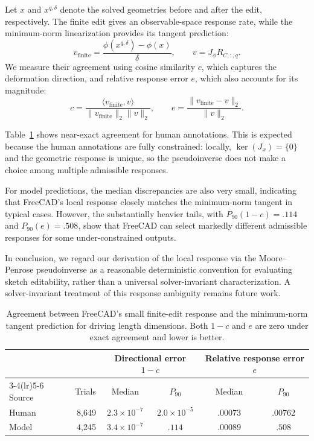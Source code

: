Let $x$ and $x^{q,\delta}$ denote the solved geometries before and after the edit, respectively. The finite edit gives an observable-space response rate, while the minimum-norm linearization provides its tangent prediction:
\begin{equation}
v_{\mathrm{finite}}=\frac{\phi(x^{q,\delta})-\phi(x)}{\delta},
\qquad
v=J_\phi R_{C,:,q}.
\end{equation}
We measure their agreement using cosine similarity $c$, which captures the deformation direction, and relative response error $e$, which also accounts for its magnitude:
\begin{equation}
c=
\frac{\langle v_{\mathrm{finite}},v\rangle}
{\|v_{\mathrm{finite}}\|_2\|v\|_2},
\qquad
e=
\frac{\|v_{\mathrm{finite}}-v\|_2}
{\|v\|_2}.
\end{equation}

Table~\ref{tab:appendix_solver_anchor} shows near-exact agreement for
human annotations. This is expected because the human annotations are
fully constrained: locally, $\ker(J_x)=\{0\}$ and the geometric
response is unique, so the pseudoinverse does not make a choice among
multiple admissible responses.

For model predictions, the median discrepancies are also very small, indicating that FreeCAD's local response closely matches the minimum-norm tangent in typical cases.
However, the substantially heavier tails, with $P_{90}(1-c)=.114$ and $P_{90}(e)=.508$, show that FreeCAD can select markedly different admissible responses for some under-constrained outputs.

In conclusion, we regard our derivation of the local response via the Moore--Penrose pseudoinverse as a reasonable deterministic convention for evaluating sketch editability, rather than a universal solver-invariant characterization. A solver-invariant treatment of this response ambiguity remains future work.

\begin{table}[t]
    \centering
    \footnotesize
    \setlength{\tabcolsep}{4.5pt}
    \caption{
    Agreement between FreeCAD's small finite-edit response and the minimum-norm tangent prediction for driving length dimensions.
    Both $1-c$ and $e$ are zero under exact agreement and lower is better.
    }
    \label{tab:appendix_solver_anchor}
    \begin{tabular}{@{}lr cc cc@{}}
        \toprule
        & & \multicolumn{2}{c}{Directional error $1-c$}
          & \multicolumn{2}{c}{Relative response error $e$} \\
        \cmidrule(lr){3-4}\cmidrule(lr){5-6}
        Source & Trials
          & Median & $P_{90}$
          & Median & $P_{90}$ \\
        \midrule
        Human
          & 8,649
          & $2.3{\times}10^{-7}$ & $2.0{\times}10^{-5}$
          & $.00073$ & $.00762$ \\
        Model
          & 4,245
          & $3.4{\times}10^{-7}$ & $.114$
          & $.00089$ & $.508$ \\
        \bottomrule
    \end{tabular}
\end{table}



